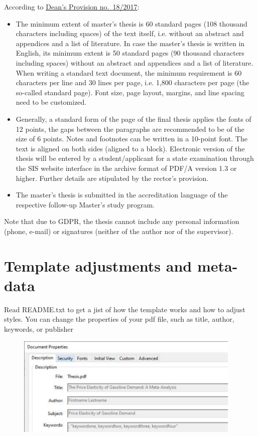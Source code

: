 According to \href{https://www.fsv.cuni.cz/deans-provision-no-182017}{Dean's Provision no.\ 18/2017}:
\begin{itemize}
		\item  The minimum extent of master's thesis is 60 standard pages (108 thousand characters including spaces) of the text itself, i.e. without an abstract and appendices and a list of literature. 
		In case the master's thesis is written in English, its minimum extent is 50 standard pages (90 thousand characters including spaces) without an abstract and appendices and a list of literature. 
		When writing a standard text document, the minimum requirement is 60 characters per line and 30 lines per page, i.e. 1,800 characters per page (the so-called standard page). 
		Font size, page layout, margins, and line spacing need to be customized.
		\item Generally, a standard form of the page of the final thesis applies the fonts of 12 points, the gaps between the paragraphs are recommended to be of the size of 6 points. 
		Notes and footnotes can be written in a 10-point font.
		The text is aligned on both sides (aligned to a block). 
		Electronic version of the thesis will be entered by a student/applicant for a state examination through the SIS website interface in the archive format of PDF/A version 1.3 or higher. 
		Further details are stipulated by the rector's provision.
		\item The master's thesis is submitted in the accreditation language of the respective follow-up Master's study program. 
\end{itemize}

Note that due to GDPR, the thesis cannot include any personal information (phone, e-mail) or signatures (neither of the author nor of the supervisor).

\section{Template adjustments and meta-data}
\label{sec:metadata}

Read README.txt to get a jist of how the template works and how to adjust styles.
You can change the properties of your pdf file, such as title, author, keywords, or publisher

\begin{figure}[H]
	\centering
		\includegraphics[width=0.96\textwidth]{Figures/properties.pdf}
	\label{fig:properties}
\end{figure}

